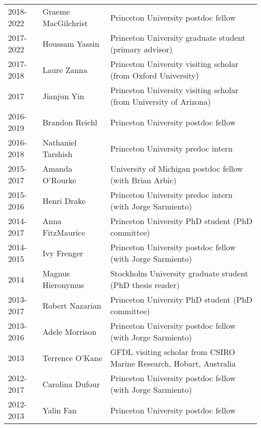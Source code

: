\documentclass{article}
\begin{document}
\begin{tabular}{lll}
2018-2022 & Graeme MacGilchrist & Princeton University postdoc fellow \\ 

2017-2022 & Houssam Yassin & Princeton University graduate student (primary advisor) \\ 

2017-2018 & Laure Zanna  & Princeton University visiting scholar (from Oxford University)  \\

2017 & Jianjun Yin       & Princeton University visiting scholar (from University of Arizona)  \\

2016-2019 & Brandon Reichl       & Princeton University postdoc fellow  \\

2016-2018 & Nathaniel Tarshish & Princeton University predoc intern \\

2015-2017 & Amanda O'Rourke  & University of Michigan postdoc fellow (with Brian Arbic) \\

2015-2016    & Henri Drake             & Princeton University predoc intern (with Jorge Sarmiento) \\

2014-2017 & Anna FitzMaurice   & Princeton University PhD student (PhD committee) \\ 

2014-2015     & Ivy Frenger            & Princeton University postdoc fellow (with Jorge Sarmiento) \\

2014 & Magnus Hieronymus& Stockholm University graduate student (PhD thesis reader) \\ 

2013-2017 & Robert Nazarian    & Princeton University PhD student (PhD committee) \\ 

2013-2016     & Adele Morrison     & Princeton University postdoc fellow (with Jorge Sarmiento) \\

2013               & Terrence O'Kane   & GFDL visiting scholar from CSIRO Marine Research, Hobart, Australia \\

2012-2017     & Carolina Dufour   & Princeton University postdoc fellow (with Jorge Sarmiento)  \\

2012-2013     & Yalin Fan              & Princeton University postdoc fellow  \\


\end{tabular}
\end{document}
